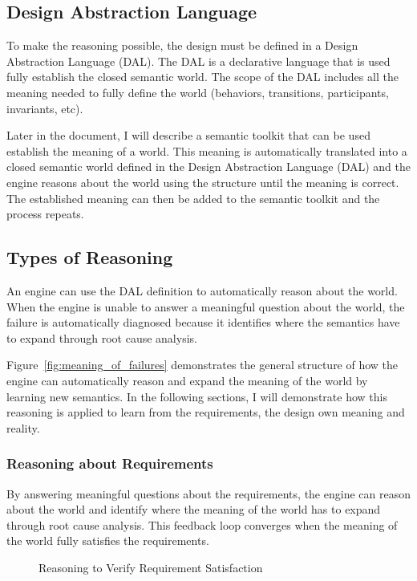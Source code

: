 \subsection{Design Abstraction Language}

To make the reasoning possible, the design must be defined in a Design Abstraction Language (DAL). The DAL is a declarative language that is used fully establish the closed semantic world. The scope of the DAL includes all the meaning needed to fully define the world (behaviors, transitions, participants, invariants, etc). 

Later in the document, I will describe a semantic toolkit that can be used establish the meaning of a world. This meaning is automatically translated into a closed semantic world defined in the Design Abstraction Language (DAL) and the engine reasons about the world using the structure until the meaning is correct. The established meaning can then be added to the semantic toolkit and the process repeats.

\subsection{Types of Reasoning}

An engine can use the DAL definition to automatically reason about the world. When the engine is unable to answer a meaningful question about the world, the failure is automatically diagnosed because it identifies where the semantics have to expand through root cause analysis. 

Figure~\ref{fig:meaning_of_failures} demonstrates the general structure of how the engine can automatically reason and expand the meaning of the world by learning new semantics. In the following sections, I will demonstrate how this reasoning is applied to learn from the requirements, the design own meaning and reality.

\subsubsection{Reasoning about Requirements}

By answering meaningful questions about the requirements, the engine can reason about the world and identify where the meaning of the world has to expand through root cause analysis. This feedback loop converges when the meaning of the world fully satisfies the requirements.

\begin{figure}[htbp]
    \centering
    
    \caption{Reasoning to Verify Requirement Satisfaction}
    \label{fig:requirement_reasoning}
\end{figure}

